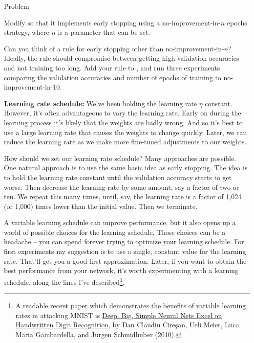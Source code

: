 \documentclass[a4paper,twoside,10pt]{book}
\begin{document}
\begin{exercize}{Problem}
\item Modify  so that it implements early stopping using a no-improvement-in-$n$ epochs strategy, where $n$ is a parameter that can be set.
\item Can you think of a rule for early stopping other than no-improvement-in-$n$? Ideally, the rule should compromise between getting high validation accuracies and not training too long. Add your rule to , and run three experiments comparing the validation accuracies and number of epochs of training to no-improvement-in-10.
\end{exercize}
\textbf{Learning rate schedule:} We've been holding the learning rate $\eta$ constant. However, it's often advantageous to vary the learning rate. Early on during the learning process it's likely that the weights are badly wrong. And so it's best to use a large learning rate that causes the weights to change quickly. Later, we can reduce the learning rate as we make more fine-tuned adjustments to our weights.

How should we set our learning rate schedule? Many approaches are possible. One natural approach is to use the same basic idea as early stopping. The idea is to hold the learning rate constant until the validation accuracy starts to get worse. Then decrease the learning rate by some amount, say a factor of two or ten. We repeat this many times, until, say, the learning rate is a factor of 1,024 (or 1,000) times lower than the initial value. Then we terminate.

A variable learning schedule can improve performance, but it also opens up a world of possible choices for the learning schedule. Those choices can be a headache -- you can spend forever trying to optimize your learning schedule. For first experiments my suggestion is to use a single, constant value for the learning rate. That'll get you a good first approximation. Later, if you want to obtain the best performance from your network, it's worth experimenting with a learning schedule, along the lines I've described\footnote{A readable recent paper which demonstrates the benefits of variable learning rates in attacking MNIST is \href{http://arxiv.org/abs/1003.0358}{Deep, Big, Simple Neural Nets Excel on Handwritten Digit Recognition}, by Dan Claudiu Cire\c{s}an, Ueli Meier, Luca Maria Gambardella, and J\"urgen Schmidhuber (2010).}.
\end{document}
